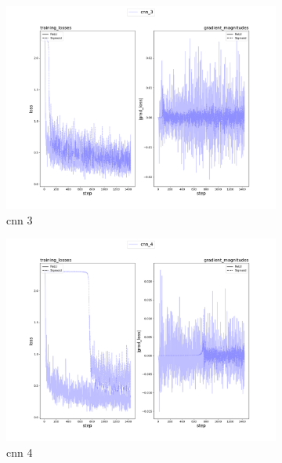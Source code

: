 \documentclass{assignment}
\begin{document}
\begin{figure}[!htb]
\begin{subfigure}{0.3\textwidth}
        \includegraphics[width=\textwidth]{figures/part4_alpha_cnn_3.png}
        \caption{cnn 3}
    \end{subfigure}
    \hfill
    \begin{subfigure}{0.3\textwidth}
        \includegraphics[width=\textwidth]{figures/part4_alpha_cnn_4.png}
        \caption{cnn 4}
    \end{subfigure}\hfill
    \begin{subfigure}{0.3\textwidth}

\end{subfigure}
\end{figure}
\end{document}
